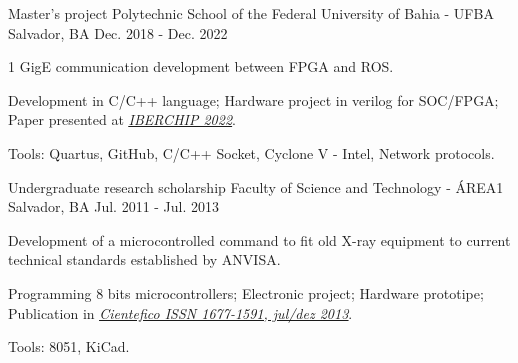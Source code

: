 \begin{cventries}
  \cventry
    {Master's project} %
    {Polytechnic School of the Federal University of Bahia - UFBA} %
    {Salvador, BA} %
    {Dec. 2018 - Dec. 2022} %
    {
      \begin{cvitems} %
        \item {1 GigE communication development between FPGA and ROS.}
        \item {Development in C/C++ language; Hardware project in verilog for SOC/FPGA; Paper presented at \underline{\href{https://ieee-lascas.org/}{\emph{IBERCHIP 2022}}}.}
        \item {Tools: Quartus, GitHub, C/C++ Socket, Cyclone V - Intel, Network protocols.}
      \end{cvitems}
    }

  \cventry
    {Undergraduate research scholarship} %
    {Faculty of Science and Technology - ÁREA1} %
    {Salvador, BA} %
    {Jul. 2011 - Jul. 2013} %
    {
      \begin{cvitems} %
        \item {Development of a microcontrolled command to fit old X-ray equipment to current technical standards established by ANVISA.}
        \item {Programming 8 bits microcontrollers; Electronic project; Hardware prototipe; Publication in \underline{\href{https://cientefico.emnuvens.com.br/cientefico/article/view/58}{\emph{Cientefico ISSN 1677-1591, jul/dez 2013}}}.}
        \item {Tools: 8051, KiCad.}
      \end{cvitems}
    }
    

\end{cventries}


